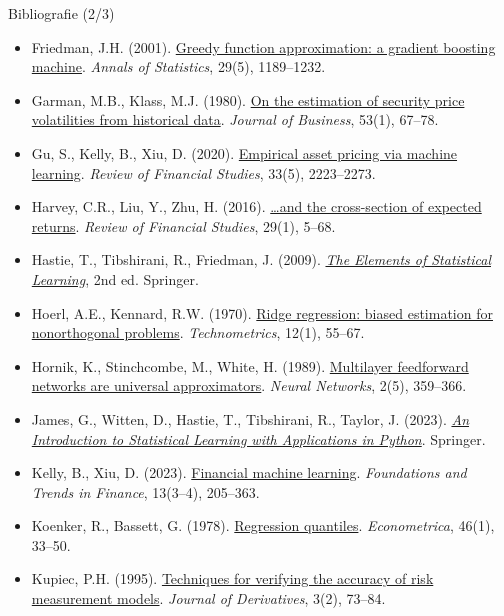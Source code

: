 \begin{frame}{Bibliografie (2/3)}
\itemsize{\tiny}
\begin{itemize}
    \item Friedman, J.H. (2001). \href{https://doi.org/10.1214/aos/1013203451}{Greedy function approximation: a gradient boosting machine}. \textit{Annals of Statistics}, 29(5), 1189--1232.
    \item Garman, M.B., Klass, M.J. (1980). \href{https://doi.org/10.1086/296072}{On the estimation of security price volatilities from historical data}. \textit{Journal of Business}, 53(1), 67--78.
    \item Gu, S., Kelly, B., Xiu, D. (2020). \href{https://doi.org/10.1093/rfs/hhaa009}{Empirical asset pricing via machine learning}. \textit{Review of Financial Studies}, 33(5), 2223--2273.
    \item Harvey, C.R., Liu, Y., Zhu, H. (2016). \href{https://doi.org/10.1093/rfs/hhv059}{\ldots and the cross-section of expected returns}. \textit{Review of Financial Studies}, 29(1), 5--68.
    \item Hastie, T., Tibshirani, R., Friedman, J. (2009). \href{https://doi.org/10.1007/978-0-387-84858-7}{\textit{The Elements of Statistical Learning}}, 2nd ed. Springer.
    \item Hoerl, A.E., Kennard, R.W. (1970). \href{https://doi.org/10.1080/00401706.1970.10488634}{Ridge regression: biased estimation for nonorthogonal problems}. \textit{Technometrics}, 12(1), 55--67.
    \item Hornik, K., Stinchcombe, M., White, H. (1989). \href{https://doi.org/10.1016/0893-6080(89)90020-8}{Multilayer feedforward networks are universal approximators}. \textit{Neural Networks}, 2(5), 359--366.
    \item James, G., Witten, D., Hastie, T., Tibshirani, R., Taylor, J. (2023). \href{https://doi.org/10.1007/978-3-031-38747-0}{\textit{An Introduction to Statistical Learning with Applications in Python}}. Springer.
    \item Kelly, B., Xiu, D. (2023). \href{https://doi.org/10.1561/0500000064}{Financial machine learning}. \textit{Foundations and Trends in Finance}, 13(3--4), 205--363.
    \item Koenker, R., Bassett, G. (1978). \href{https://doi.org/10.2307/1913643}{Regression quantiles}. \textit{Econometrica}, 46(1), 33--50.
    \item Kupiec, P.H. (1995). \href{https://doi.org/10.3905/jod.1995.407942}{Techniques for verifying the accuracy of risk measurement models}. \textit{Journal of Derivatives}, 3(2), 73--84.
\end{itemize}
\end{frame}

